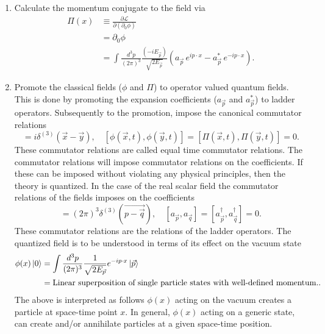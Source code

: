 \begin{enumerate}
	\item Calculate the momentum conjugate to the field via
	\begin{equation}
		\begin{split}
			\Pi(x)&\equiv \frac{\partial \mathcal{L}}{\partial (\partial_0\phi)}\\
			&=\partial_0\phi\\
			&=\int \frac{d^3 p}{(2\pi)^3}\frac{(-iE_{\vec{p}})}{\sqrt{2E_{\vec{p}}}}(a_{\vec{p}}\,e^{ip\cdot x}-a_{\vec{p}}^*\,e^{-ip\cdot x}).
		\end{split}
	\end{equation} 
	
	\item Promote the classical fields ($\phi$ and $\Pi$) to operator valued quantum fields. This is done by promoting the expansion coefficients ($a_{\vec{p}}$ and $a_{\vec{p}}^*$) to ladder operators. Subsequently to the promotion, impose the canonical commutator relations
	\begin{equation}
		[\phi(\vec{x},t),\Pi(\vec{y},t)]=i\delta^{(3)}(\vec{x}-\vec{y}),\quad [\phi(\vec{x},t),\phi(\vec{y},t)]=[\Pi(\vec{x},t),\Pi(\vec{y},t)]=0.
	\end{equation} 
	These commutator relations are called equal time commutator relations. The commutator relations will impose commutator relations on the coefficients. If these can be imposed without violating any physical principles, then the theory is quantized. In the case of the real scalar field the commutator relations of the fields imposes on the coefficients
	\begin{equation}
		[a_{\vec{p}},a_{\vec{q}}^\dagger]=(2\pi)^3\delta^{(3)}(\vec{p-\vec{q}}), \quad [a_{\vec{p}},a_{\vec{q}}]=[a_{\vec{p}}^\dagger,a_{\vec{q}}^\dagger]=0.
	\end{equation} 
	These commutator relations are the relations of the ladder operators. The quantized field is to be understood in terms of its effect on the vacuum state
	\begin{equation}
		\begin{split}
			\phi(x)\ket{0}&=\int \frac{d^3p}{(2\pi)^3}\frac{1}{\sqrt{2E_{\vec{p}}}} e^{-ip\cdot x}\ket{\vec{p}}\\
			&=\text{Linear superposition of single particle states with well-defined momentum.}.\\
		\end{split}
	\end{equation} 
	The above is interpreted as follows $\phi(x)$ acting on the vacuum creates a particle at space-time point $x$. In general, $\phi(x)$ acting on a generic state, can create and/or annihilate particles at a given space-time position.

\end{enumerate}
